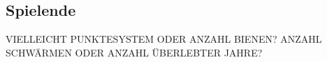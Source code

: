 \subsection{Spielende}
VIELLEICHT PUNKTESYSTEM ODER ANZAHL BIENEN? ANZAHL SCHWÄRMEN ODER ANZAHL ÜBERLEBTER JAHRE?

